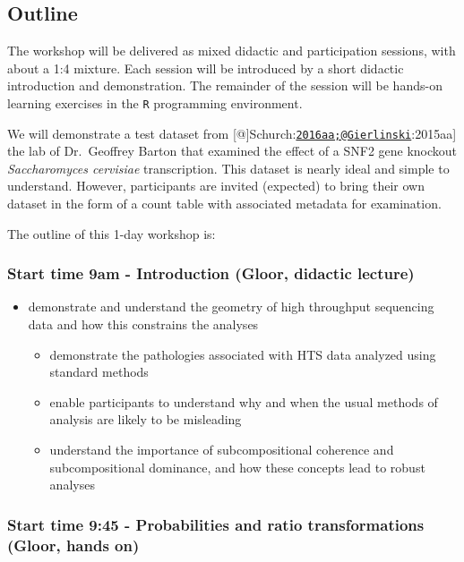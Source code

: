 \documentclass[twocolumn]{article}
\providecommand{\tightlist}{%
  \setlength{\itemsep}{0pt}\setlength{\parskip}{0pt}}
\begin{document}
\hypertarget{outline}{%
\subsection{Outline}\label{outline}}

The workshop will be delivered as mixed didactic and participation
sessions, with about a 1:4 mixture. Each session will be introduced by a
short didactic introduction and demonstration. The remainder of the
session will be hands-on learning exercises in the \texttt{R}
programming environment.

We will demonstrate a test dataset from
{[}@{]}Schurch:\href{mailto:2016aa;@Gierlinski}{\nolinkurl{2016aa;@Gierlinski}}:2015aa{]}
the lab of Dr.~Geoffrey Barton that examined the effect of a SNF2 gene
knockout \emph{Saccharomyces cervisiae} transcription. This dataset is
nearly ideal and simple to understand. However, participants are invited
(expected) to bring their own dataset in the form of a count table with
associated metadata for examination.

The outline of this 1-day workshop is:

\hypertarget{start-time-9am---introduction-gloor-didactic-lecture}{%
\subsubsection{Start time 9am - Introduction (Gloor, didactic
lecture)}\label{start-time-9am---introduction-gloor-didactic-lecture}}

\begin{itemize}
\tightlist
\item
  demonstrate and understand the geometry of high throughput sequencing
  data and how this constrains the analyses

  \begin{itemize}
  \tightlist
  \item
    demonstrate the pathologies associated with HTS data analyzed using
    standard methods
  \item
    enable participants to understand why and when the usual methods of
    analysis are likely to be misleading
  \item
    understand the importance of subcompositional coherence and
    subcompositional dominance, and how these concepts lead to robust
    analyses
  \end{itemize}
\end{itemize}

\hypertarget{start-time-945---probabilities-and-ratio-transformations-gloor-hands-on}{%
\subsubsection{Start time 9:45 - Probabilities and ratio transformations
(Gloor, hands
on)}\label{start-time-945---probabilities-and-ratio-transformations-gloor-hands-on}}
\end{document}
